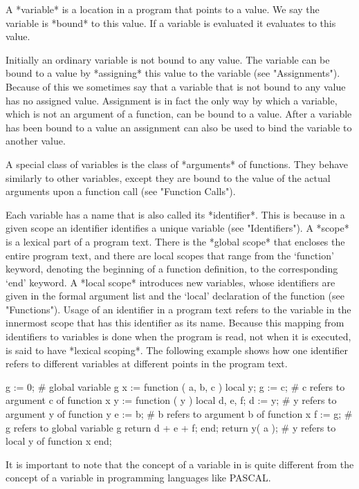 {
A *variable* is a location in a {\GAP} program that points to a value.
We say the variable is *bound* to this value. If a variable is evaluated
it evaluates to this value.

Initially an ordinary variable is not bound to any value. The variable
can be bound to a value by *assigning* this value to the variable (see
"Assignments"). Because of this we sometimes say that a variable that is
not bound to any value has no assigned value. Assignment is in fact the
only way by which a variable, which is not an argument of a function, can
be bound to a value. After a variable has been bound to a  value an
assignment can also be used to bind the variable to another value.

A special class of variables is the class of *arguments* of functions.
They behave similarly to other variables,
except they are bound to the value of the
actual arguments upon a function call (see "Function Calls").

Each variable has a name that is also called its *identifier*. This is
because in a given scope an identifier identifies a unique variable (see
"Identifiers"). A *scope* is a lexical part of a program text. There is
the *global scope* that encloses the entire program text, and there are
local scopes that range from the `function' keyword, denoting the
beginning of a function definition, to the corresponding `end' keyword.
A *local scope* introduces new variables, whose identifiers are given in
the formal argument list and the `local' declaration of the function (see
"Functions"). Usage of an identifier in a program text refers to the
variable in the innermost scope that has this identifier as its name.
Because this mapping from identifiers to variables is done when the
program is read, not when it is executed, {\GAP} is said to have *lexical
scoping*.  The following example shows how one identifier refers to
different variables at different points in the program text.

\begintt
g := 0;      # global variable g
x := function ( a, b, c )
  local  y;
  g := c;     # c refers to argument c of function x
  y := function ( y )
    local d, e, f;
    d := y;   # y refers to argument y of function y
    e := b;   # b refers to argument b of function x
    f := g;   # g refers to global variable g
    return d + e + f;
  end;
  return y( a ); # y refers to local y of function x
end;
\endtt

It is important to note that the concept of a variable in {\GAP} is quite
different from the concept of a variable in programming languages like
PASCAL.

}
